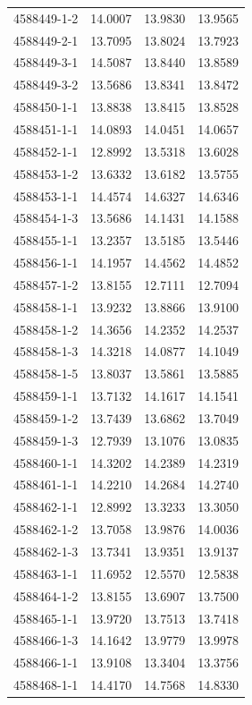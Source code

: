 \begin{longtable}{lrrr}
4588449-1-2 & 14.0007 & 13.9830 & 13.9565 \\
4588449-2-1 & 13.7095 & 13.8024 & 13.7923 \\
4588449-3-1 & 14.5087 & 13.8440 & 13.8589 \\
4588449-3-2 & 13.5686 & 13.8341 & 13.8472 \\
4588450-1-1 & 13.8838 & 13.8415 & 13.8528 \\
4588451-1-1 & 14.0893 & 14.0451 & 14.0657 \\
4588452-1-1 & 12.8992 & 13.5318 & 13.6028 \\
4588453-1-2 & 13.6332 & 13.6182 & 13.5755 \\
4588453-1-1 & 14.4574 & 14.6327 & 14.6346 \\
4588454-1-3 & 13.5686 & 14.1431 & 14.1588 \\
4588455-1-1 & 13.2357 & 13.5185 & 13.5446 \\
4588456-1-1 & 14.1957 & 14.4562 & 14.4852 \\
4588457-1-2 & 13.8155 & 12.7111 & 12.7094 \\
4588458-1-1 & 13.9232 & 13.8866 & 13.9100 \\
4588458-1-2 & 14.3656 & 14.2352 & 14.2537 \\
4588458-1-3 & 14.3218 & 14.0877 & 14.1049 \\
4588458-1-5 & 13.8037 & 13.5861 & 13.5885 \\
4588459-1-1 & 13.7132 & 14.1617 & 14.1541 \\
4588459-1-2 & 13.7439 & 13.6862 & 13.7049 \\
4588459-1-3 & 12.7939 & 13.1076 & 13.0835 \\
4588460-1-1 & 14.3202 & 14.2389 & 14.2319 \\
4588461-1-1 & 14.2210 & 14.2684 & 14.2740 \\
4588462-1-1 & 12.8992 & 13.3233 & 13.3050 \\
4588462-1-2 & 13.7058 & 13.9876 & 14.0036 \\
4588462-1-3 & 13.7341 & 13.9351 & 13.9137 \\
4588463-1-1 & 11.6952 & 12.5570 & 12.5838 \\
4588464-1-2 & 13.8155 & 13.6907 & 13.7500 \\
4588465-1-1 & 13.9720 & 13.7513 & 13.7418 \\
4588466-1-3 & 14.1642 & 13.9779 & 13.9978 \\
4588466-1-1 & 13.9108 & 13.3404 & 13.3756 \\
4588468-1-1 & 14.4170 & 14.7568 & 14.8330 \\

\end{longtable}
